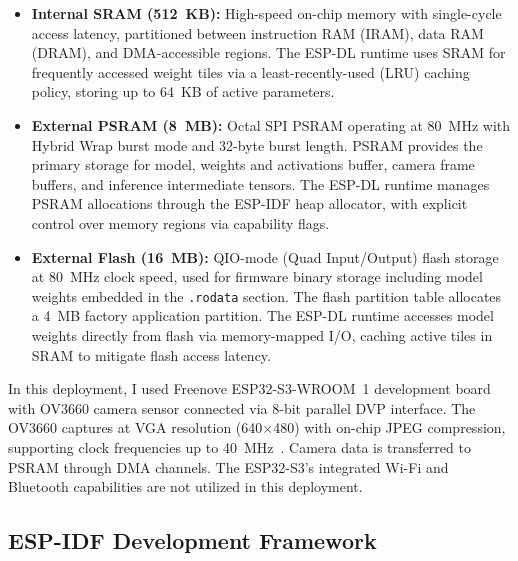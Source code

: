 \begin{itemize}
    \item \textbf{Internal SRAM (512~KB):} High-speed on-chip memory with single-cycle access latency, partitioned between instruction RAM (IRAM), data RAM (DRAM), and DMA-accessible regions. The ESP-DL runtime uses SRAM for frequently accessed weight tiles via a least-recently-used (LRU) caching policy, storing up to 64~KB of active parameters.
    \item \textbf{External PSRAM (8~MB):} Octal SPI PSRAM operating at 80~MHz with Hybrid Wrap burst mode and 32-byte burst length. PSRAM provides the primary storage for model, weights and activations buffer, camera frame buffers, and inference intermediate tensors. The ESP-DL runtime manages PSRAM allocations through the ESP-IDF heap allocator, with explicit control over memory regions via capability flags.
    \item \textbf{External Flash (16~MB):} QIO-mode (Quad Input/Output) flash storage at 80~MHz clock speed, used for firmware binary storage including model weights embedded in the \texttt{.rodata} section. The flash partition table allocates a 4~MB factory application partition. The ESP-DL runtime accesses model weights directly from flash via memory-mapped I/O, caching active tiles in SRAM to mitigate flash access latency.
\end{itemize}
In this deployment, I used Freenove ESP32-S3-WROOM~1 development board~\cite{freenove2024esp32s3} with OV3660 camera sensor connected via 8-bit parallel DVP interface. The OV3660 captures at VGA resolution (640$\times$480) with on-chip JPEG compression, supporting clock frequencies up to 40~MHz~\cite{esp32s3_datasheet}. Camera data is transferred to PSRAM through DMA channels. The ESP32-S3's integrated Wi-Fi and Bluetooth capabilities are not utilized in this deployment.
\subsection{ESP-IDF Development Framework}
\label{subsec:esp_idf}

